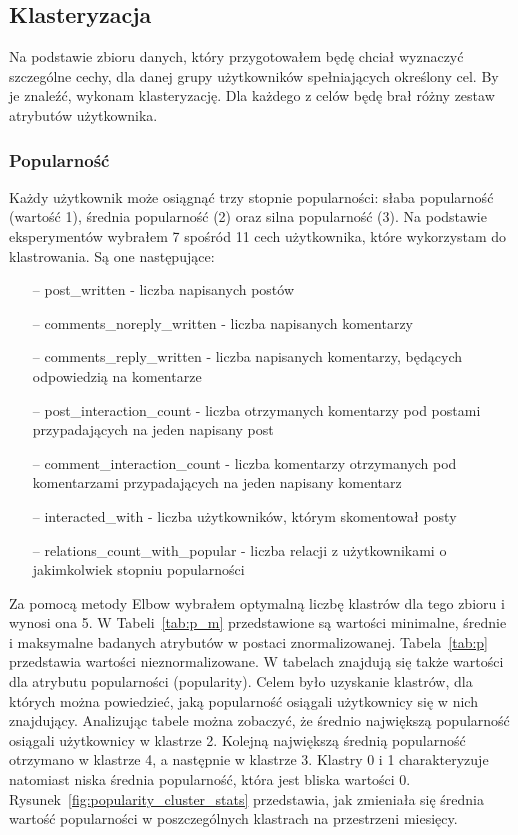 \documentclass[polish,12pt]{aghthesis}
\begin{document}
\subsection{Klasteryzacja}

Na podstawie zbioru danych, który przygotowałem będę chciał wyznaczyć szczególne cechy, dla danej grupy użytkowników spełniających określony cel. By je znaleźć, wykonam klasteryzację. Dla każdego z celów będę brał różny zestaw atrybutów użytkownika.


\subsubsection{Popularność}

Każdy użytkownik może osiągnąć trzy stopnie popularności: słaba popularność (wartość 1), średnia popularność (2) oraz silna popularność (3). Na podstawie eksperymentów wybrałem 7 spośród 11 cech użytkownika, które wykorzystam do klastrowania. Są one następujące:

\begin{itemize}
    \setlength\itemsep{0,1em}
    \item[--] post\_written - liczba napisanych postów
    \item[--] comments\_noreply\_written - liczba napisanych komentarzy 
    \item[--] comments\_reply\_written - liczba napisanych komentarzy, będących odpowiedzią na komentarze 
    \item[--] post\_interaction\_count - liczba otrzymanych komentarzy pod postami przypadających na jeden napisany post 
    \item[--] comment\_interaction\_count - liczba komentarzy otrzymanych pod komentarzami przypadających na jeden napisany komentarz 
    \item[--] interacted\_with - liczba użytkowników, którym skomentował posty 
    \item[--] relations\_count\_with\_popular - liczba relacji z użytkownikami o jakimkolwiek stopniu popularności 
\end{itemize}


Za pomocą metody Elbow\cite{elbow} wybrałem optymalną liczbę klastrów dla tego zbioru i wynosi ona 5. W Tabeli~\ref{tab:p_m} przedstawione są wartości minimalne, średnie i maksymalne badanych atrybutów w postaci znormalizowanej. Tabela~\ref{tab:p} przedstawia wartości nieznormalizowane. W tabelach znajdują się także wartości dla atrybutu popularności (popularity). Celem było uzyskanie klastrów, dla których można powiedzieć, jaką popularność osiągali użytkownicy się w nich znajdujący. Analizując tabele można zobaczyć, że średnio największą popularność osiągali użytkownicy w klastrze 2. Kolejną największą średnią popularność otrzymano w klastrze 4, a następnie w klastrze 3. Klastry 0 i 1 charakteryzuje natomiast niska średnia popularność, która jest bliska wartości 0.  Rysunek~\ref{fig:popularity_cluster_stats} przedstawia, jak zmieniała się średnia wartość popularności w poszczególnych klastrach na przestrzeni miesięcy.
\end{document}
